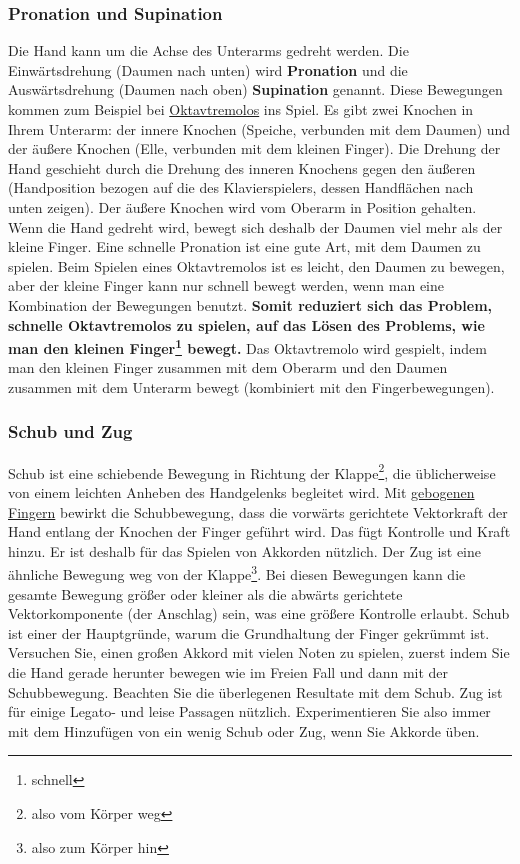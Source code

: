 \subsubsection{Pronation und Supination}
\label{c1iii4ProSup}

Die Hand kann um die Achse des Unterarms gedreht werden.
Die Einwärtsdrehung (Daumen nach unten) wird \textbf{Pronation} und die Auswärtsdrehung (Daumen nach oben) \textbf{Supination} genannt.
Diese Bewegungen kommen zum  Beispiel bei \hyperref[c1iii3b]{Oktavtremolos} ins Spiel.
Es gibt zwei Knochen in Ihrem Unterarm: der innere Knochen (Speiche, verbunden mit dem Daumen) und der äußere Knochen (Elle, verbunden mit dem kleinen Finger).
Die Drehung der Hand geschieht durch die Drehung des inneren Knochens gegen den äußeren (Handposition bezogen auf die des Klavierspielers, dessen Handflächen nach unten zeigen).
Der äußere Knochen wird vom Oberarm in Position gehalten.
Wenn die Hand gedreht wird, bewegt sich deshalb der Daumen viel mehr als der kleine Finger.
Eine schnelle Pronation ist eine gute Art, mit dem Daumen zu spielen.
Beim Spielen eines Oktavtremolos ist es leicht, den Daumen zu bewegen, aber der kleine Finger kann nur schnell bewegt werden, wenn man eine Kombination der Bewegungen benutzt.
\textbf{Somit reduziert sich das Problem, schnelle Oktavtremolos zu spielen, auf das Lösen des Problems, wie man den kleinen Finger\footnote{schnell} bewegt.}
Das Oktavtremolo wird gespielt, indem man den kleinen Finger zusammen mit dem Oberarm und den Daumen zusammen mit dem Unterarm bewegt (kombiniert mit den Fingerbewegungen).
 

\subsubsection{Schub und Zug}
\label{c1iii4SchubZug}

Schub ist eine schiebende Bewegung in Richtung der Klappe\footnote{also vom Körper weg}, die üblicherweise von einem leichten Anheben des Handgelenks begleitet wird.
Mit \hyperref[c1ii2]{gebogenen Fingern} bewirkt die Schubbewegung, dass die vorwärts gerichtete Vektorkraft der Hand entlang der Knochen der Finger geführt wird.
Das fügt Kontrolle und Kraft hinzu.
Er ist deshalb für das Spielen von Akkorden nützlich.
Der Zug ist eine ähnliche Bewegung weg von der Klappe\footnote{also zum Körper hin}.
Bei diesen Bewegungen kann die gesamte Bewegung größer oder kleiner als die abwärts gerichtete Vektorkomponente (der Anschlag) sein, was eine größere Kontrolle erlaubt.
Schub ist einer der Hauptgründe, warum die Grundhaltung der Finger gekrümmt ist.
Versuchen Sie, einen großen Akkord mit vielen Noten zu spielen, zuerst indem Sie die Hand gerade herunter bewegen wie im Freien Fall und dann mit der Schubbewegung.
Beachten Sie die überlegenen Resultate mit dem Schub.
Zug ist für einige Legato- und leise Passagen nützlich.
Experimentieren Sie also immer mit dem Hinzufügen von ein wenig Schub oder Zug, wenn Sie Akkorde üben.


